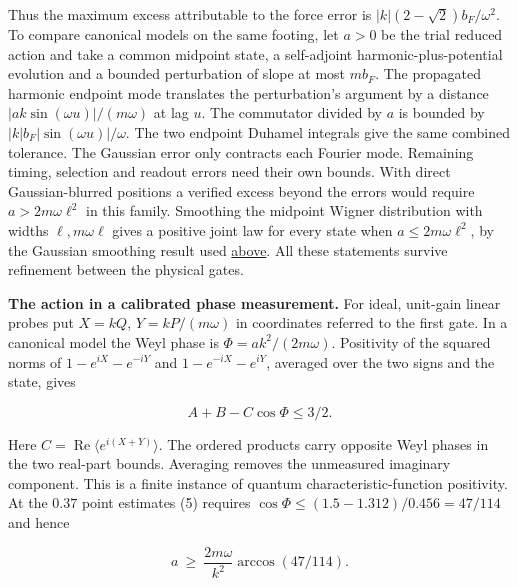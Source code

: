 \documentclass[11pt,a4paper]{article}
\begin{document}
Thus the maximum excess attributable to the force error is
\(|k|(2-\sqrt{2})b_F/\omega^2\). To compare canonical models on the same
footing, let \(a>0\) be the trial reduced action and take a common
midpoint state, a self-adjoint harmonic-plus-potential evolution and a
bounded perturbation of slope at most \(mb_F\). The propagated harmonic
endpoint mode translates the perturbation's argument by a distance
\(|ak\sin(\omega u)|/(m\omega)\) at lag \(u\). The commutator divided by
\(a\) is bounded by \(|k|b_F|\sin(\omega u)|/\omega\). The two endpoint
Duhamel integrals give the same combined tolerance. The Gaussian error
only contracts each Fourier mode. Remaining timing, selection and
readout errors need their own bounds. With direct Gaussian-blurred
positions a verified excess beyond the errors would require
\(a>2m\omega\ell^2\) in this family. Smoothing the midpoint Wigner
distribution with widths \(\ell,m\omega\ell\) gives a positive joint law
for every state when \(a\le2m\omega\ell^2\), by the Gaussian smoothing
result used
\hyperref[a-three-time-test-with-a-calibrated-position-resolution]{above}.
All these statements survive refinement between the physical gates.

\textbf{The action in a calibrated phase measurement.} For ideal,
unit-gain linear probes put \(X=kQ\), \(Y=kP/(m\omega)\) in coordinates
referred to the first gate. In a canonical model the Weyl phase is
\(\Phi=ak^2/(2m\omega)\). Positivity of the squared norms of
\(1-e^{iX}-e^{-iY}\) and \(1-e^{-iX}-e^{iY}\), averaged over the two
signs and the state, gives

\[
                  A+B-C\cos\Phi\le 3/2 .                         \tag{5}
\]

Here \(C=\operatorname{Re}\langle e^{i(X+Y)}\rangle\). The ordered
products carry opposite Weyl phases in the two real-part bounds.
Averaging removes the unmeasured imaginary component. This is a finite
instance of quantum characteristic-function positivity. At the \(0.37\)
point estimates (5) requires \(\cos\Phi\le(1.5-1.312)/0.456=47/114\) and
hence

\[
       a\ \ge\ \frac{2m\omega}{k^2}\arccos(47/114) .              \tag{6}
\]
\end{document}
